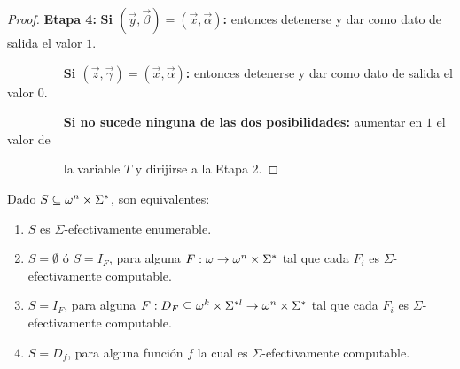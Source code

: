 \begin{proof}
    \textbf{Etapa 4:}
    \textbf{Si $(\vec{y}, \vec{\beta}) = (\vec{x}, \vec{\alpha})$:} entonces detenerse y dar como dato de salida el
    valor $1$.

    $\qquad\qquad\;\;$\textbf{Si $(\vec{z}, \vec{\gamma}) = (\vec{x}, \vec{\alpha})$:} entonces detenerse y dar como
    dato de salida el valor $0$.

    $\qquad\qquad\;\;$\textbf{Si no sucede ninguna de las dos posibilidades:} aumentar en $1$ el valor de

    $\qquad\qquad\;\;$la variable $T$ y dirijirse a la Etapa 2.
  \end{proof}

  \begin{theorem}
    \par Dado $S \subseteq \omega^{n} \times \Sigma^{\ast}$, son equivalentes:

    \begin{enumerate}
      \item $S$ es $\Sigma$-efectivamente enumerable.
      \item $S = \emptyset$ ó $S = I_{F}$, para alguna $F: \omega \rightarrow \omega^{n} \times \Sigma^{\ast}$ tal que cada
        $F_{i}$ es $\Sigma$-efectivamente computable.
      \item $S = I_{F}$, para alguna $F:D_{F} \subseteq \omega^{k} \times \Sigma^{\ast l} \rightarrow \omega^{n} \times
        \Sigma^{\ast}$ tal que cada $F_{i}$ es $\Sigma$-efectivamente computable.
      \item $S = D_{f}$, para alguna función $f$ la cual es $\Sigma$-efectivamente computable.
    \end{enumerate}
  \end{theorem}

